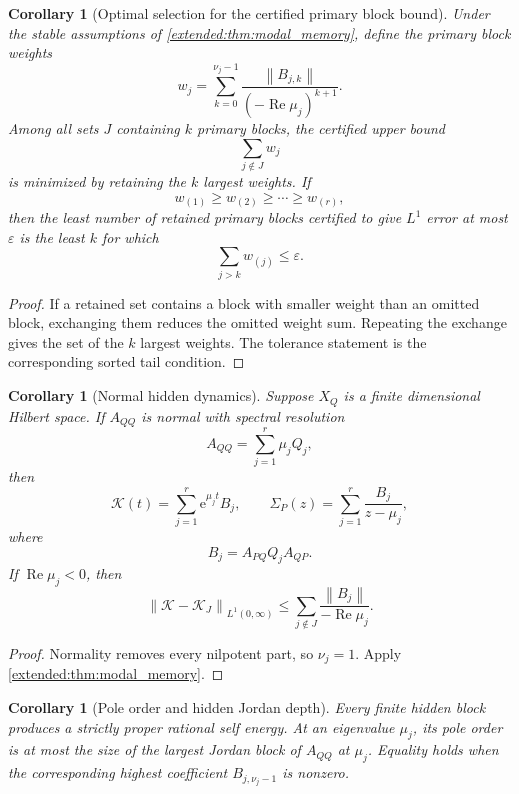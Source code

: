 \documentclass[11pt,a4paper]{article}
\newtheorem{corollary}[theorem]{Corollary}
\theoremstyle{definition}
\theoremstyle{remark}
\newcommand{\norm}[1]{\left\lVert#1\right\rVert}
\newcommand{\Kcal}{\mathcal K}
\newcommand{\e}{\mathrm e}
\begin{document}
\begin{corollary}[Optimal selection for the certified primary block bound]\label{extended:record:090}\label{extended:cor:optimal_primary_selection}
Under the stable assumptions of \cref{extended:thm:modal_memory}, define the primary block weights
\[
w_j
=
\sum_{k=0}^{\nu_j-1}
\frac{\norm{B_{j,k}}}
{(-\operatorname{Re}\mu_j)^{k+1}}.
\]
Among all sets \(J\) containing \(k\) primary blocks, the certified upper bound
\[
\sum_{j\notin J}w_j
\]
is minimized by retaining the \(k\) largest weights. If
\[
w_{(1)}\geq w_{(2)}\geq\cdots\geq w_{(r)},
\]
then the least number of retained primary blocks certified to give \(L^1\) error at most \(\varepsilon\) is the least \(k\) for which
\[
\sum_{j>k}w_{(j)}\leq\varepsilon.
\]
\end{corollary}

\begin{proof}
If a retained set contains a block with smaller weight than an omitted block, exchanging them reduces the omitted weight sum. Repeating the exchange gives the set of the \(k\) largest weights. The tolerance statement is the corresponding sorted tail condition.
\end{proof}

\begin{corollary}[Normal hidden dynamics]\label{extended:record:091}\label{extended:cor:normal_modal_memory}
Suppose \(X_Q\) is a finite dimensional Hilbert space. If \(A_{QQ}\) is normal with spectral resolution
\[
A_{QQ}=\sum_{j=1}^r\mu_jQ_j,
\]
then
\[
\Kcal(t)=\sum_{j=1}^r\e^{\mu_jt}B_j,
\qquad
\Sigma_P(z)=\sum_{j=1}^r\frac{B_j}{z-\mu_j},
\]
where
\[
B_j=A_{PQ}Q_jA_{QP}.
\]
If \(\operatorname{Re}\mu_j<0\), then
\[
\norm{\Kcal-\Kcal_J}_{L^1(0,\infty)}
\leq
\sum_{j\notin J}
\frac{\norm{B_j}}{-\operatorname{Re}\mu_j}.
\]
\end{corollary}

\begin{proof}
Normality removes every nilpotent part, so \(\nu_j=1\). Apply \cref{extended:thm:modal_memory}.
\end{proof}

\begin{corollary}[Pole order and hidden Jordan depth]\label{extended:record:092}\label{extended:cor:pole_jordan_depth}
Every finite hidden block produces a strictly proper rational self energy. At an eigenvalue \(\mu_j\), its pole order is at most the size of the largest Jordan block of \(A_{QQ}\) at \(\mu_j\). Equality holds when the corresponding highest coefficient \(B_{j,\nu_j-1}\) is nonzero.
\end{corollary}
\end{document}
